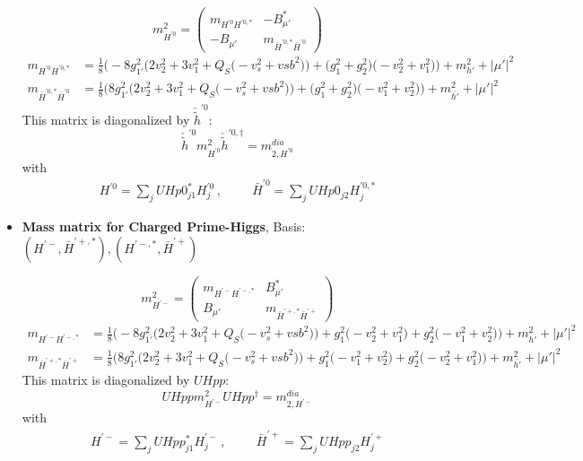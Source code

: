 \begin{itemize}
\begin{equation} 
m^2_{H^{'0}} = \left( 
\begin{array}{cc}
m_{H^{'0}H^{{'0},*}} &- B_{\mu'}^* \\ 
- B_{\mu'}  &m_{\bar{H}^{{'0},*}\bar{H}^{'0}}\end{array} 
\right) 
 \end{equation} 
\begin{align} 
m_{H^{'0}H^{{'0},*}} &= \frac{1}{8} \Big(-8 g_{1'}^{2} \Big(2 v_{2}^{2}  + 3 v_{1}^{2}  + Q_{S} \Big(- v_{s}^{2}  + vsb^{2}\Big)\Big) + \Big(g_{1}^{2} + g_{2}^{2}\Big)\Big(- v_{2}^{2}  + v_{1}^{2}\Big)\Big) + m_{h'}^2 + |\mu'|^2\\ 
m_{\bar{H}^{{'0},*}\bar{H}^{'0}} &= \frac{1}{8} \Big(8 g_{1'}^{2} \Big(2 v_{2}^{2}  + 3 v_{1}^{2}  + Q_{S} \Big(- v_{s}^{2}  + vsb^{2}\Big)\Big) + \Big(g_{1}^{2} + g_{2}^{2}\Big)\Big(- v_{1}^{2}  + v_{2}^{2}\Big)\Big) + m_{\bar{h'}}^2 + |\mu'|^2
\end{align} 
This matrix is diagonalized by \(\check{\tilde{h}}^{'0}\): 
\begin{equation} 
\check{\tilde{h}}^{'0} m^2_{H^{'0}} \check{\tilde{h}}^{'0,\dagger} = m^{dia}_{2,H^{'0}} 
\end{equation} 
with 
\begin{align} 
H^{'0} = \sum_{j}UHp0^*_{j 1}H^{'0}_{{j}}\,, \hspace{1cm} 
\bar{H}^{'0} = \sum_{j}UHp0_{{j 2}}H^{{'0},*}_{{j}}
\end{align} 
\item {\bf Mass matrix for Charged Prime-Higgs}, Basis: \( \left(H^{'-}, \bar{H}^{{'+},*}\right), \left(H^{{'-},*}, \bar{H}^{'+}\right) \) 
 
\begin{equation} 
m^2_{H^{'-}} = \left( 
\begin{array}{cc}
m_{H^{'-}H^{{'-},*}} &B_{\mu'}^*\\ 
B_{\mu'} &m_{\bar{H}^{{'+},*}\bar{H}^{'+}}\end{array} 
\right) 
 \end{equation} 
\begin{align} 
m_{H^{'-}H^{{'-},*}} &= \frac{1}{8} \Big(-8 g_{1'}^{2} \Big(2 v_{2}^{2}  + 3 v_{1}^{2}  + Q_{S} \Big(- v_{s}^{2}  + vsb^{2}\Big)\Big) + g_{1}^{2} \Big(- v_{2}^{2}  + v_{1}^{2}\Big) + g_{2}^{2} \Big(- v_{1}^{2}  + v_{2}^{2}\Big)\Big) + m_{h'}^2 + |\mu'|^2\\ 
m_{\bar{H}^{{'+},*}\bar{H}^{'+}} &= \frac{1}{8} \Big(8 g_{1'}^{2} \Big(2 v_{2}^{2}  + 3 v_{1}^{2}  + Q_{S} \Big(- v_{s}^{2}  + vsb^{2}\Big)\Big) + g_{1}^{2} \Big(- v_{1}^{2}  + v_{2}^{2}\Big) + g_{2}^{2} \Big(- v_{2}^{2}  + v_{1}^{2}\Big)\Big) + m_{\bar{h'}}^2 + |\mu'|^2
\end{align} 
This matrix is diagonalized by \(UHpp\): 
\begin{equation} 
UHpp m^2_{H^{'-}} UHpp^{\dagger} = m^{dia}_{2,H^{'-}} 
\end{equation} 
with 
\begin{align} 
H^{'-} = \sum_{j}UHpp^*_{j 1}H^{'-}_{{j}}\,, \hspace{1cm} 
\bar{H}^{'+} = \sum_{j}UHpp_{{j 2}}H^{'+}_{{j}}
\end{align} 
\end{itemize} 

